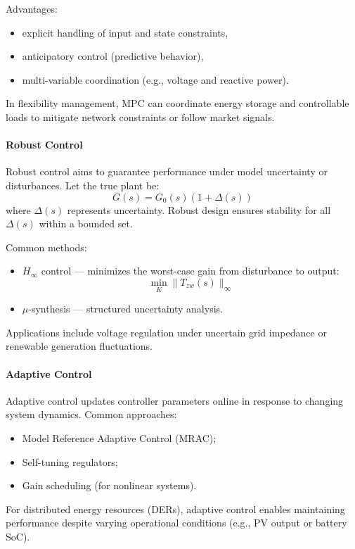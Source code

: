 \documentclass[11pt]{article}
\begin{document}
	Advantages:
	\begin{itemize}
		\item explicit handling of input and state constraints,
		\item anticipatory control (predictive behavior),
		\item multi-variable coordination (e.g., voltage and reactive power).
	\end{itemize}
	
	In flexibility management, MPC can coordinate energy storage and controllable loads to mitigate network constraints or follow market signals.
	
	\paragraph{Robust Control}
	
	Robust control aims to guarantee performance under model uncertainty or disturbances.  
	Let the true plant be:
	\[
	G(s) = G_0(s) (1 + \Delta(s))
	\]
	where $\Delta(s)$ represents uncertainty.  
	Robust design ensures stability for all $\Delta(s)$ within a bounded set.
	
	Common methods:
	\begin{itemize}
		\item $H_\infty$ control — minimizes the worst-case gain from disturbance to output:
		\[
		\min_{K} \| T_{zw}(s) \|_\infty
		\]
		\item $\mu$-synthesis — structured uncertainty analysis.
	\end{itemize}
	
	Applications include voltage regulation under uncertain grid impedance or renewable generation fluctuations.
	
	\paragraph{Adaptive Control}
	
	Adaptive control updates controller parameters online in response to changing system dynamics.  
	Common approaches:
	\begin{itemize}
		\item Model Reference Adaptive Control (MRAC);
		\item Self-tuning regulators;
		\item Gain scheduling (for nonlinear systems).
	\end{itemize}
	
	For distributed energy resources (DERs), adaptive control enables maintaining performance despite varying operational conditions (e.g., PV output or battery SoC).
	
\end{document}
